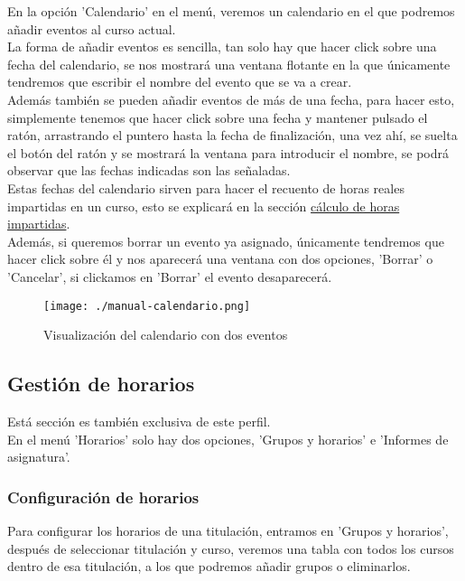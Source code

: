 En la opción 'Calendario' en el menú, veremos un calendario en el que podremos añadir eventos al curso actual.\\

La forma de añadir eventos es sencilla, tan solo hay que hacer click sobre una fecha del calendario, se nos mostrará una ventana flotante en la que únicamente tendremos que escribir el nombre del evento que se va a crear.\\

Además también se pueden añadir eventos de más de una fecha, para hacer esto, simplemente tenemos que hacer click sobre una fecha y mantener pulsado el ratón, arrastrando el puntero hasta la fecha de finalización, una vez ahí, se suelta el botón del ratón y se mostrará la ventana para introducir el nombre, se podrá observar que las fechas indicadas son las señaladas.\\

Estas fechas del calendario sirven para hacer el recuento de horas reales impartidas en un curso, esto se explicará en la sección \hyperref[manual_calculo_horas]{cálculo de horas impartidas}.
\\
Además, si queremos borrar un evento ya asignado, únicamente tendremos que hacer click sobre él y nos aparecerá una ventana con dos opciones, 'Borrar' o 'Cancelar', si clickamos en 'Borrar' el evento desaparecerá.

\begin{figure}[H] 
  \label{manual-calendario} 
	\begin{center}
    \texttt{[image: ./manual-calendario.png]}
  \end{center}
\caption{Visualización del calendario con dos eventos}
\end{figure}


\subsection{Gestión de horarios}
Está sección es también exclusiva de este perfil.
\\
En el menú 'Horarios' solo hay dos opciones, 'Grupos y horarios' e 'Informes de asignatura'.

\subsubsection{Configuración de horarios}

Para configurar los horarios de una titulación, entramos en 'Grupos y horarios', después de seleccionar titulación y curso, veremos una tabla con todos los cursos dentro de esa titulación, a los que podremos añadir grupos o eliminarlos.\\


